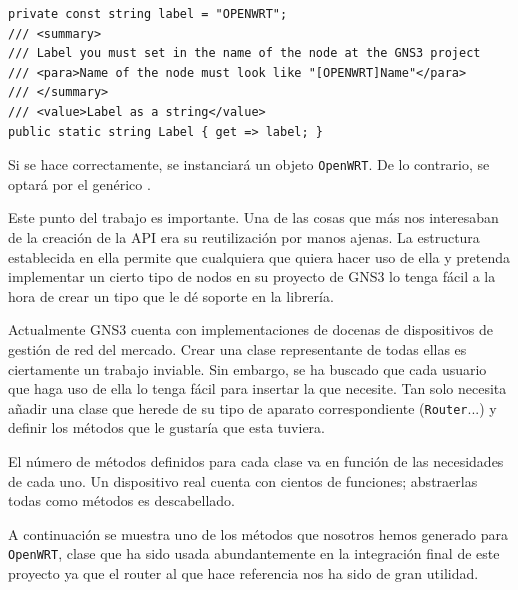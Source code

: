 \begin{lstlisting}[language={[Sharp]C}, caption={Etiqueta de \texttt{OpenWRT}}, label={herederosnode1}]
private const string label = "OPENWRT";
/// <summary>
/// Label you must set in the name of the node at the GNS3 project
/// <para>Name of the node must look like "[OPENWRT]Name"</para>
/// </summary>
/// <value>Label as a string</value>
public static string Label { get => label; }
\end{lstlisting}

Si se hace correctamente, se instanciará un objeto \texttt{OpenWRT}. De lo contrario, se optará por el genérico \NODE.

Este punto del trabajo es importante. Una de las cosas que más nos interesaban de la creación de la API era su reutilización por manos ajenas. La estructura establecida en ella permite que cualquiera que quiera hacer uso de ella y pretenda implementar un cierto tipo de nodos en su proyecto de GNS3 lo tenga fácil a la hora de crear un tipo que le dé soporte en la librería.

Actualmente GNS3 cuenta con implementaciones de docenas de dispositivos de gestión de red del mercado. Crear una clase representante de todas ellas es ciertamente un trabajo inviable. Sin embargo, se ha buscado que cada usuario que haga uso de ella lo tenga fácil para insertar la que necesite. Tan solo necesita añadir una clase que herede de su tipo de aparato correspondiente (\texttt{Router}...) y definir los métodos que le gustaría que esta tuviera.

El número de métodos definidos para cada clase va en función de las necesidades de cada uno. Un dispositivo real cuenta con cientos de funciones; abstraerlas todas como métodos es descabellado.

A continuación se muestra uno de los métodos que nosotros hemos generado para \texttt{OpenWRT}, clase que ha sido usada abundantemente en la integración final de este proyecto ya que el router al que hace referencia nos ha sido de gran utilidad.

